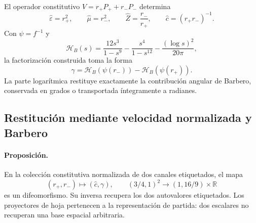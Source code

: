 El operador constitutivo $V=r_+P_++r_-P_-$ determina
\begin{equation}
 \widehat\varepsilon=r_+^2,\qquad \widehat\mu=r_-^2,
 \qquad \widehat Z=\frac{r_-}{r_+},\qquad
 \widehat c=(r_+r_-)^{-1}.
 \label{md:compos:lectores-constitutivos}
\end{equation}
Con $\psi=f^{-1}$ y
\begin{equation}
 \mathcal H_B(s)=\frac{12s^3}{1-s^9}
 -\frac{s^4}{1-s^{12}}-\frac{(\log s)^2}{20\pi},
 \label{md:compos:h-barbero}
\end{equation}
la factorización construida toma la forma
\begin{equation}
 \gamma=\mathcal H_B(\psi(r_-))-\mathcal H_B(\psi(r_+)).
 \label{md:compos:factorizacion-barbero}
\end{equation}
La parte logarítmica restituye exactamente la contribución angular de
Barbero, conservada en grados o transportada íntegramente a radianes.

\subsection{Restitución mediante velocidad normalizada y Barbero}
\label{md:compos:difeomorfismo}

\paragraph{Proposición.}
En la colección constitutiva normalizada de dos canales etiquetados, el mapa
\begin{equation}
 (r_+,r_-)\longmapsto(\widehat c,\gamma),\qquad
 (3/4,1)^2\longrightarrow(1,16/9)\times\mathbb R
 \label{md:compos:mapa-global}
\end{equation}
es un difeomorfismo. Su inversa recupera los dos autovalores etiquetados.
Los proyectores de hoja pertenecen a la representación de partida: dos
escalares no recuperan una base espacial arbitraria.

